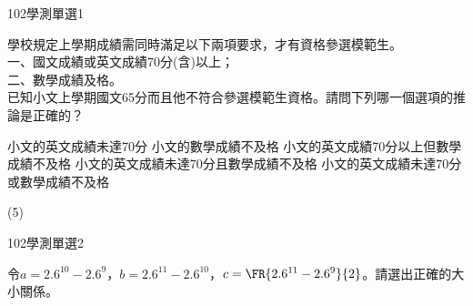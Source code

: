 \begin{QUESTIONS}
    \begin{QUESTION}
        \begin{ExamInfo}{102}{學測}{單選}{1}
        \end{ExamInfo}
        \begin{ExamAnsRateInfo}{70}{88}{73}{49}
        \end{ExamAnsRateInfo}
        \begin{QBODY}
            學校規定上學期成績需同時滿足以下兩項要求，才有資格參選模範生。\\
				一、國文成績或英文成績70分(含)以上；\\
				二、數學成績及格。\\
				已知小文上學期國文65分而且他不符合參選模範生資格。請問下列哪一個選項的推論是正確的？
				\begin{QOPS}
					\QOP 小文的英文成績未達70分
					\QOP 小文的數學成績不及格
					\QOP 小文的英文成績70分以上但數學成績不及格
					\QOP 小文的英文成績未達70分且數學成績不及格
					\QOP 小文的英文成績未達70分或數學成績不及格
				\end{QOPS}
        \end{QBODY}
        \begin{QFROMS}
        \end{QFROMS}
        \begin{QTAGS}\end{QTAGS}
        \begin{QANS}
            (5)
        \end{QANS}
        \begin{QSOLLIST}
        \end{QSOLLIST}
        \begin{QEMPTYSPACE}
        \end{QEMPTYSPACE}
    \end{QUESTION}
    \begin{QUESTION}
        \begin{ExamInfo}{102}{學測}{單選}{2}
        \end{ExamInfo}
        \begin{ExamAnsRateInfo}{66}{90}{72}{36}
        \end{ExamAnsRateInfo}
        \begin{QBODY}
            令$a={{2.6}^{10}}-{{2.6}^{9}}$，$b={{2.6}^{11}}-{{2.6}^{10}}$，$c=\FR{{{2.6}^{11}}-{{2.6}^{9}}}{2}$。請選出正確的大小關係。

\end{QBODY}
\end{QUESTION}
\end{QUESTIONS}
